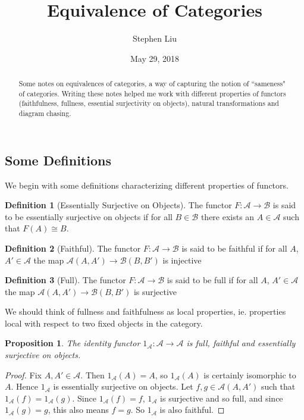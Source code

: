 \documentclass[11pt]{article}
\theoremstyle{definition}
\newtheorem*{defn}{Definition}
\theoremstyle{plain}
\theoremstyle{plain}
\newtheorem{prop}{Proposition}
\theoremstyle{plain}
\begin{document}
\author{Stephen Liu}
\title{Equivalence of Categories}
\date{May 29, 2018}

\maketitle

\begin{abstract}
Some notes on equivalences of categories, a way of capturing the notion of ``sameness" of categories. Writing these notes helped me work with different properties of functors (faithfulness, fullness, essential surjectivity on objects), natural transformations and diagram chasing.
\end{abstract}

\subsection*{Some Definitions}

We begin with some definitions characterizing different properties of functors.

\begin{defn}[Essentially Surjective on Objects]
The functor $F:\mathscr{A}\to\mathscr{B}$ is said to be essentially surjective on objects if for all $B\in\mathscr{B} $ there exists an $A\in\mathscr{A}$ such that $F(A)\cong B$.
\end{defn}

\begin{defn}[Faithful]
The functor $F:\mathscr{A}\to\mathscr{B}$ is said to be faithful if for all $A$, $A' \in \mathscr{A}$ the map $\mathscr{A}(A, A') \to \mathscr{B}(B, B')$ is injective
\end{defn}

\begin{defn}[Full]
The functor $F:\mathscr{A}\to\mathscr{B}$ is said to be full if for all $A$, $A' \in \mathscr{A}$ the map $\mathscr{A}(A, A') \to \mathscr{B}(B, B')$ is surjective
\end{defn}

We should think of fullness and faithfulness as local properties, ie. properties local with respect to two fixed objects in the category.

\begin{prop}
The identity functor $1_{\mathscr{A}}:\mathscr{A}\to\mathscr{A}$ is full, faithful and essentially surjective on objects.
\end{prop}

\begin{proof}
Fix $A,A'\in\mathscr{A}$. Then $1_{\mathscr{A}}(A)=A$, so $1_{\mathscr{A}}(A)$ is certainly isomorphic to $A$. Hence $1_{\mathscr{A}}$ is essentially surjective on objects. Let $f,g\in\mathscr{A}(A,A')$ such that $1_{\mathscr{A}}(f)=1_{\mathscr{A}}(g)$. Since $1_{\mathscr{A}}(f)=f$, $1_{\mathscr{A}}$ is surjective and so full, and since $1_{\mathscr{A}}(g)=g$, this also means $f=g$. So $1_{\mathscr{A}}$ is also faithful. 
\end{proof}
\end{document}
